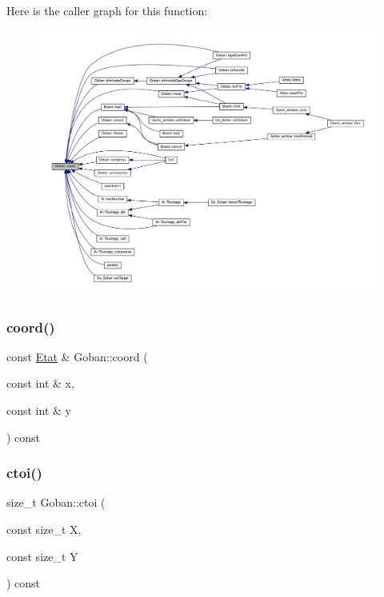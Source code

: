 Here is the caller graph for this function\+:
\nopagebreak
\begin{figure}[H]
\begin{center}
\leavevmode
\includegraphics[width=350pt]{class_goban_a29aaf8df380fe614845d48cba057747c_icgraph}
\end{center}
\end{figure}
\mbox{\label{class_goban_ac674775d4101d921257acc21cfec935c}} 
\subsubsection{\texorpdfstring{coord()}{coord()}\hspace{0.1cm}{\footnotesize\ttfamily [2/2]}}
{\footnotesize\ttfamily const \hyperlink{class_etat}{Etat} \& Goban\+::coord (\begin{DoxyParamCaption}\item[{const int \&}]{x,  }\item[{const int \&}]{y }\end{DoxyParamCaption}) const}

\mbox{\label{class_goban_a579840586df08a58983f6b497979344b}} 
\subsubsection{\texorpdfstring{ctoi()}{ctoi()}}
{\footnotesize\ttfamily size\+\_\+t Goban\+::ctoi (\begin{DoxyParamCaption}\item[{const size\+\_\+t}]{X,  }\item[{const size\+\_\+t}]{Y }\end{DoxyParamCaption}) const}


